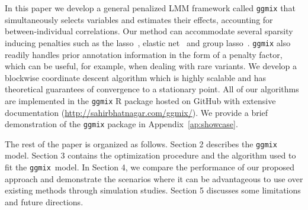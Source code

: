 \documentclass[12pt,letter]{article}\usepackage[]{graphicx}\usepackage[]{color}
\newcommand{\ggmix}{\texttt{ggmix}}
\begin{document}
In this paper we develop a general penalized LMM framework called \texttt{ggmix} that simultaneously selects variables and estimates their effects, accounting for between-individual correlations.
Our method can accommodate several sparsity inducing penalties such as the lasso~\citep{tibshirani1996regression}, elastic net~\citep{zou2005regularization} and group lasso~\citep{yuan2006model}.
\texttt{ggmix} also readily handles prior annotation information in the form of a penalty factor, which can be useful, for example, when dealing with rare variants.
We develop a blockwise coordinate descent algorithm which is highly scalable and has theoretical guarantees of convergence to a stationary point.
All of our algorithms are implemented in the \texttt{ggmix} R package hosted on GitHub with extensive documentation (\url{http://sahirbhatnagar.com/ggmix/}). We provide a brief demonstration of the \texttt{ggmix} package in Appendix~\ref{ap:showcase}.

The rest of the paper is organized as follows. Section 2 describes the \texttt{ggmix} model.
Section 3 contains the optimization procedure and the algorithm used to fit the \ggmix~model.
In Section 4, we compare the performance of our proposed approach and demonstrate the scenarios where it can be advantageous to use over existing methods through simulation studies.
Section 5 discusses some limitations and future directions.



\end{document}
